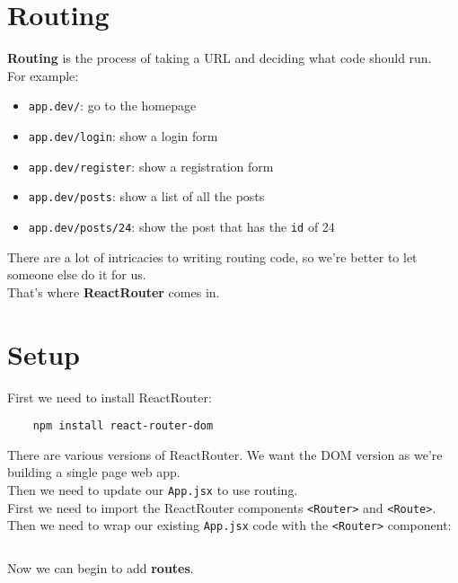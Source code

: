 \section{Routing}

\textbf{Routing} is the process of taking a URL and deciding what code should run.
\\

For example:

\begin{itemize}
    \item \texttt{app.dev/}: go to the homepage
    \item \texttt{app.dev/login}: show a login form
    \item \texttt{app.dev/register}: show a registration form
    \item \texttt{app.dev/posts}: show a list of all the posts
    \item \texttt{app.dev/posts/24}: show the post that has the \texttt{id} of 24
\end{itemize}

There are a lot of intricacies to writing routing code, so we're better to let someone else do it for us.
\\

That's where \textbf{ReactRouter} comes in.



\section{Setup}



First we need to install ReactRouter:

\begin{verbatim}
    npm install react-router-dom
\end{verbatim}

There are various versions of ReactRouter. We want the DOM version as we're building a single page web app.
\\

Then we need to update our \texttt{App.jsx} to use routing.
\\

First we need to import the ReactRouter components \texttt{<Router>} and \texttt{<Route>}. Then we need to wrap our existing \texttt{App.jsx} code with the \texttt{<Router>} component:

\inputminted{jsx}{04/figures/01/01-Router.jsx}

Now we can begin to add \textbf{routes}.


